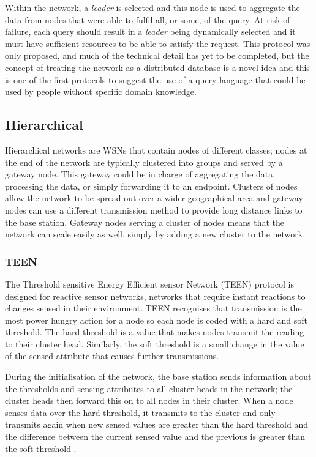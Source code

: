 Within the network, a \textit{leader} is selected and this node is used to aggregate the data from nodes that were able to fulfil all, or some, of the query. At risk of failure, each query should result in a \textit{leader} being dynamically selected and it must have sufficient resources to be able to satisfy the request. This protocol was only proposed, and much of the technical detail has yet to be completed, but the concept of treating the network as a distributed database is a novel idea and this is one of the first protocols to suggest the use of a query language that could be used by people without specific domain knowledge.

\subsection{Hierarchical}
	Hierarchical networks are WSNs that contain nodes of different classes; nodes at the end of the network are typically clustered into groups and served by a gateway node. This gateway could be in charge of aggregating the data, processing the data, or simply forwarding it to an endpoint. Clusters of nodes allow the network to be spread out over a wider geographical area and gateway nodes can use a different transmission method to provide long distance links to the base station. Gateway nodes serving a cluster of nodes means that the network can scale easily as well, simply by adding a new cluster to the network.

\subsubsection{TEEN}
	The Threshold sensitive Energy Efficient sensor Network (TEEN) protocol is designed for reactive sensor networks, networks that require instant reactions to changes sensed in their environment. TEEN recognises that transmission is the most power hungry action for a node so each node is coded with a hard and soft threshold. The hard threshold is a value that makes nodes transmit the reading to their cluster head. Similarly, the soft threshold is a small change in the value of the sensed attribute that causes further transmissions.

During the initialisation of the network, the base station sends information about the thresholds and sensing attributes to all cluster heads in the network; the cluster heads then forward this on to all nodes in their cluster.  When a node senses data over the hard threshold, it transmits to the cluster and only transmits again when new sensed values are greater than the hard threshold and the difference between the current sensed value and the previous is greater than the soft threshold \cite{Manjeshwar2001}.

